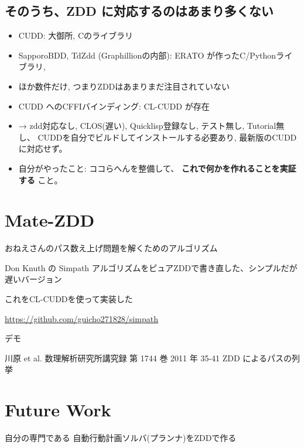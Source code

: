 \subsection{そのうち、ZDD に対応するのはあまり多くない}
\label{sec-7-1}

\begin{itemize}
\item CUDD: 大御所, Cのライブラリ
\item SapporoBDD, TdZdd (Graphillionの内部): ERATO が作ったC/Pythonライブラリ,
\item ほか数件だけ, つまりZDDはあまりまだ注目されていない

\item CUDD へのCFFIバインディング: CL-CUDD が存在

\item → zdd対応なし, CLOS(遅い), Quicklisp登録なし, テスト無し, Tutorial無し、
CUDDを自分でビルドしてインストールする必要あり, 最新版のCUDDに対応せず。

\item 自分がやったこと: ココらへんを整備して、 \textbf{これで何かを作れることを実証する} こと。
\end{itemize}

\section{Mate-ZDD}
\label{sec-8}

おねえさんのパス数え上げ問題を解くためのアルゴリズム

Don Knuth の Simpath アルゴリズムをピュアZDDで書き直した、シンプルだが遅いバージョン

これをCL-CUDDを使って実装した

\url{https://github.com/guicho271828/simpath}

デモ

\begin{note}
川原 et al. 数理解析研究所講究録 第 1744 巻 2011 年 35-41 ZDD によるパスの列挙
\end{note}

\section{Future Work}
\label{sec-9}

自分の専門である 自動行動計画ソルバ(プランナ)をZDDで作る

